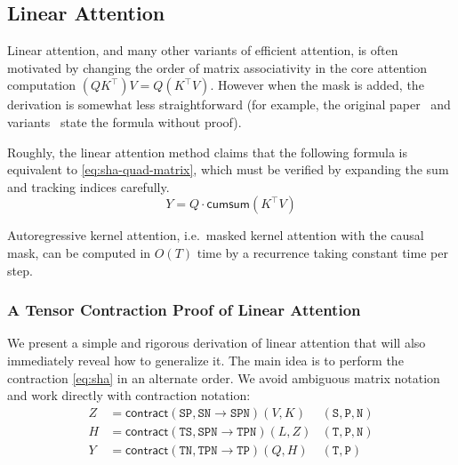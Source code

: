 \subsection{Linear Attention}
\label{sec:linear-attention}

Linear attention, and many other variants of efficient attention, is often motivated by changing the order of matrix associativity in the core attention computation $(QK^\top)V = Q(K^\top V)$.
However when the mask is added, the derivation is somewhat less straightforward (for example, the original paper~\citep{katharopoulos2020transformers} and variants~\citep{sun2023retentive} state the formula without proof).

Roughly, the linear attention method claims that the following formula
is equivalent to \eqref{eq:sha-quad-matrix}, which must be verified by expanding the sum and tracking indices carefully.
\begin{equation}
  \label{eq:sha-lin-matrix}
  Y = Q \cdot \mathsf{cumsum}(K^\top V)
\end{equation}

\begin{proposition}
  \label{prop:linear-attention}
  Autoregressive kernel attention, i.e.\ masked kernel attention with the causal mask, can be computed in $O(T)$ time by a recurrence taking constant time per step.
\end{proposition}

\subsubsection{A Tensor Contraction Proof of Linear Attention}

We present a simple and rigorous derivation of linear attention that will also immediately reveal how to generalize it.
The main idea is to perform the contraction \eqref{eq:sha} in an alternate order.
We avoid ambiguous matrix notation and work directly with contraction notation:
\begin{subequations}
  \label{eq:sha-lin}
  \begin{align}
    \label{eq:sha-lin:1}
    Z &= \mathsf{contract}(\mathtt{SP},\mathtt{SN} \to \mathtt{SPN})(V, K) & \mathtt{(S,P,N)} \\
    \label{eq:sha-lin:2}
    H &= \mathsf{contract}(\mathtt{TS},\mathtt{SPN} \to \mathtt{TPN})(L, Z) & \mathtt{(T,P,N)} \\
    \label{eq:sha-lin:3}
    Y &= \mathsf{contract}(\mathtt{TN},\mathtt{TPN} \to \mathtt{TP})(Q, H) & \mathtt{(T,P)}
  \end{align}
\end{subequations}


